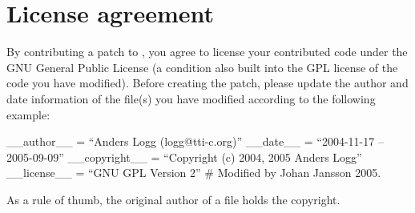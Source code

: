 

\section{License agreement}

By contributing a patch to \package{}, you agree to license your
contributed code under the GNU General Public License (a condition
also built into the GPL license of the code you have modified). Before
creating the patch, please update the author and date information of
the file(s) you have modified according to the following example:

\begin{code}
  __author__ = ``Anders Logg (logg@tti-c.org)''
  __date__ = ``2004-11-17 -- 2005-09-09''
  __copyright__ = ``Copyright (c) 2004, 2005 Anders Logg''
  __license__  = ``GNU GPL Version 2''
  # Modified by Johan Jansson 2005.
\end{code}

As a rule of thumb, the original author of a file holds the copyright.
